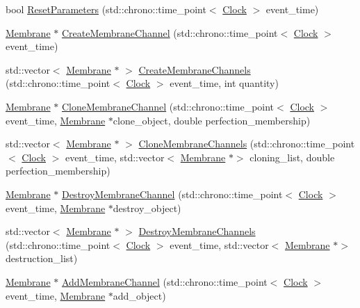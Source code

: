 \begin{DoxyCompactItemize}
\item 
bool \hyperlink{class_membrane_a9c49462cf63495381a52e2defc80b1e4}{Reset\+Parameters} (std\+::chrono\+::time\+\_\+point$<$ \hyperlink{universe_8h_a0ef8d951d1ca5ab3cfaf7ab4c7a6fd80}{Clock} $>$ event\+\_\+time)
\item 
\hyperlink{class_membrane}{Membrane} $\ast$ \hyperlink{class_membrane_a589b56529ac634a52b2a5fc78d356973}{Create\+Membrane\+Channel} (std\+::chrono\+::time\+\_\+point$<$ \hyperlink{universe_8h_a0ef8d951d1ca5ab3cfaf7ab4c7a6fd80}{Clock} $>$ event\+\_\+time)
\item 
std\+::vector$<$ \hyperlink{class_membrane}{Membrane} $\ast$ $>$ \hyperlink{class_membrane_a72987fae41e552af5befcd9a62aa6e46}{Create\+Membrane\+Channels} (std\+::chrono\+::time\+\_\+point$<$ \hyperlink{universe_8h_a0ef8d951d1ca5ab3cfaf7ab4c7a6fd80}{Clock} $>$ event\+\_\+time, int quantity)
\item 
\hyperlink{class_membrane}{Membrane} $\ast$ \hyperlink{class_membrane_a9514ca4d4378e6467d2059a9d5f9b99b}{Clone\+Membrane\+Channel} (std\+::chrono\+::time\+\_\+point$<$ \hyperlink{universe_8h_a0ef8d951d1ca5ab3cfaf7ab4c7a6fd80}{Clock} $>$ event\+\_\+time, \hyperlink{class_membrane}{Membrane} $\ast$clone\+\_\+object, double perfection\+\_\+membership)
\item 
std\+::vector$<$ \hyperlink{class_membrane}{Membrane} $\ast$ $>$ \hyperlink{class_membrane_aa9958ea461092c0d2aceb07c9c34373c}{Clone\+Membrane\+Channels} (std\+::chrono\+::time\+\_\+point$<$ \hyperlink{universe_8h_a0ef8d951d1ca5ab3cfaf7ab4c7a6fd80}{Clock} $>$ event\+\_\+time, std\+::vector$<$ \hyperlink{class_membrane}{Membrane} $\ast$$>$ cloning\+\_\+list, double perfection\+\_\+membership)
\item 
\hyperlink{class_membrane}{Membrane} $\ast$ \hyperlink{class_membrane_a12413d933a62b3bbb7931c6ab25de7de}{Destroy\+Membrane\+Channel} (std\+::chrono\+::time\+\_\+point$<$ \hyperlink{universe_8h_a0ef8d951d1ca5ab3cfaf7ab4c7a6fd80}{Clock} $>$ event\+\_\+time, \hyperlink{class_membrane}{Membrane} $\ast$destroy\+\_\+object)
\item 
std\+::vector$<$ \hyperlink{class_membrane}{Membrane} $\ast$ $>$ \hyperlink{class_membrane_aea71c4443f2fc22359ac3f770ff7755e}{Destroy\+Membrane\+Channels} (std\+::chrono\+::time\+\_\+point$<$ \hyperlink{universe_8h_a0ef8d951d1ca5ab3cfaf7ab4c7a6fd80}{Clock} $>$ event\+\_\+time, std\+::vector$<$ \hyperlink{class_membrane}{Membrane} $\ast$$>$ destruction\+\_\+list)
\item 
\hyperlink{class_membrane}{Membrane} $\ast$ \hyperlink{class_membrane_a3e3b4f55f028541e7513f826d01a689a}{Add\+Membrane\+Channel} (std\+::chrono\+::time\+\_\+point$<$ \hyperlink{universe_8h_a0ef8d951d1ca5ab3cfaf7ab4c7a6fd80}{Clock} $>$ event\+\_\+time, \hyperlink{class_membrane}{Membrane} $\ast$add\+\_\+object)

\end{DoxyCompactItemize}
